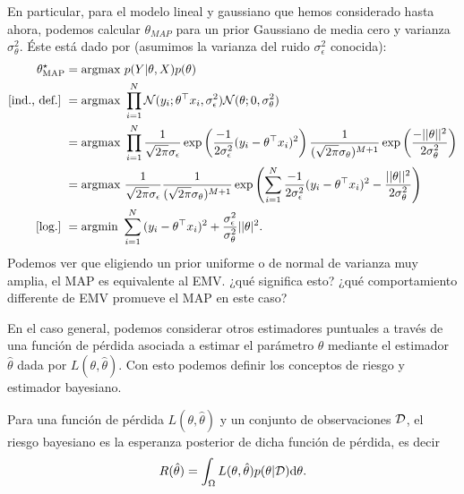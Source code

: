 \begin{example}
En particular, para el modelo lineal y gaussiano que hemos considerado hasta ahora, podemos calcular $\theta_{MAP}$ para un prior Gaussiano de media cero y varianza $\sigma_\theta^2$. Éste está dado por (asumimos la varianza del ruido $\sigma_\epsilon^2$ conocida):	
\begin{align}
	\theta_\text{MAP}^\star 	&= \text{argmax } p(Y|\theta,X)p(\theta)\nonumber\\
	\text{[ind., def.]}\ &= \text{argmax } \prod_{i=1}^N {\mathcal N}(y_i;\theta^\top x_i,\sigma_\epsilon^2){\mathcal N}(\theta;0,\sigma_\theta^2) \nonumber\\
	&= \text{argmax } \prod_{i=1}^N \frac{1}{\sqrt{2\pi}\sigma_\epsilon} \exp\left({\frac{-1}{2\sigma_\epsilon^2}(y_i-\theta^\top x_i)^2}\right)											\frac{1}{(\sqrt{2\pi}\sigma_\theta)^{M+1}} \exp\left({\frac{-||\theta||^2}{2\sigma_\theta^2}}\right) \nonumber\\
	 &= \text{argmax } \frac{1}{\sqrt{2\pi}\sigma_\epsilon} \frac{1}{(\sqrt{2\pi}\sigma_\theta)^{M+1}} \exp\left( \sum_{i=1}^N{\frac{-1}{2\sigma_\epsilon^2}(y_i-\theta^\top x_i)^2} -{\frac{||\theta||^2}{2\sigma_\theta^2}}\right) \nonumber\\
	\text{[log.]}\  &= \text{argmin } \sum_{i=1}^N{(y_i-\theta^\top x_i)^2} +{\frac{\sigma_\epsilon^2}{\sigma_\theta^2}||\theta |^2}.\nonumber 
	\label{eq:MAP_reg_lin}
\end{align}
Podemos ver que eligiendo un prior uniforme o de normal de varianza muy amplia, el MAP es equivalente al EMV. ¿qué significa esto? ¿qué comportamiento differente de EMV promueve el MAP en este caso?
\end{example}

En el caso general, podemos considerar otros estimadores puntuales a través de una función de pérdida asociada a estimar el parámetro $\theta$ mediante el estimador $\hat\theta$ dada por $L(\theta,\hat\theta)$. Con esto podemos definir los conceptos de riesgo y estimador bayesiano.
\begin{definition}
Para una función de pérdida $L(\theta,\hat\theta)$ y un conjunto de observaciones ${\mathcal D}$, el riesgo bayesiano es la esperanza posterior de dicha función de pérdida, es decir
\begin{equation}
    R(\hat\theta) = \int_\Omega L(\theta,\hat\theta)p(\theta|{\mathcal D}){\text{d}}\theta.
\end{equation}
\end{definition}



